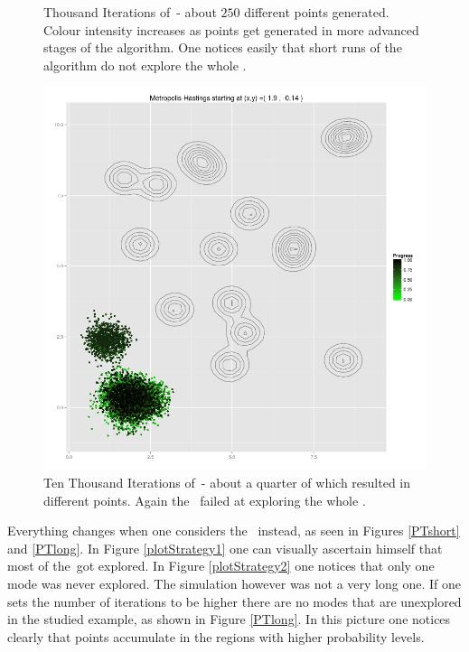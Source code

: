 \begin{figure}
\begin{minipage}[b]{.5\linewidth}
	\end{minipage}
	\caption[Thousand Iterations of \MHalgo]{Thousand Iterations of \MHalgo\,- about $250$ different points generated. Colour intensity increases as points get generated in more advanced stages of the algorithm. One notices easily that short runs of the algorithm do not explore the whole \sspace.}\label{unexploredShort}
\end{figure}


\begin{figure}[ht]
	\centering 
	\includegraphics[width=.5\textwidth,keepaspectratio]{./img/MH_simululation_10000_steps.png}
	\caption[]{Ten Thousand Iterations of \MHalgo\,- about a quarter of which resulted in different points. Again the \MH\, failed at exploring the whole \sspace.}\label{unexploredLong}
\end{figure}


Everything changes when one considers the \PT\, instead, as seen in Figures \ref{PTshort} and \ref{PTlong}. In Figure \ref{plotStrategy1} one can visually ascertain himself that most of the \sspace\,got explored. In Figure \ref{plotStrategy2} one notices that only one mode was never explored. The simulation however was not a very long one. If one sets the number of iterations to be higher there are no modes that are unexplored in the studied example, as shown in Figure \ref{PTlong}. In this picture one notices clearly that points accumulate in the regions with higher probability levels.  

